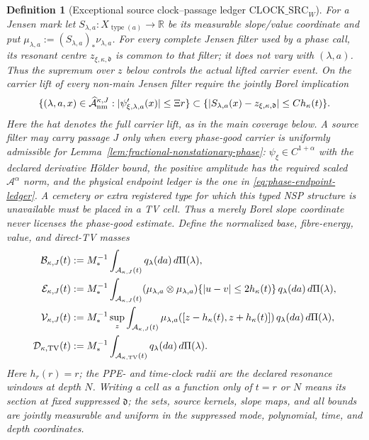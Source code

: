 \documentclass[11pt]{article}
\newtheorem{definition}[theorem]{Definition}
\begin{document}
\begin{definition}[Exceptional source clock--passage ledger
$\mathrm{CLOCK\_SRC}_{W}$]
For a Jensen mark let $S_{\lambda,a}:X_{\operatorname{type}(a)}\to\mathbb R$
be its measurable slope/value coordinate and put
$\mu_{\lambda,a}:=(S_{\lambda,a})_*\nu_{\lambda,a}$.
For every complete Jensen filter used by a phase call, its resonant centre
$z_{\xi,\kappa,\mathfrak d}$ is common to that filter; it does not vary with
$(\lambda,a)$.  Thus the supremum over $z$ below controls the actual lifted
carrier event.  On the carrier lift of every non-main Jensen filter require
the jointly Borel implication
\begin{equation}
\label{eq:nonmain-phase-bad-implication}
 \{(\lambda,a,x)\in\widehat{\mathcal A}_{\rm nm}^{\kappa,J}:
       |\psi'_{\xi,\lambda,a}(x)|\le\Xi r\}
 \subset
 \{|S_{\lambda,a}(x)-z_{\xi,\kappa,\mathfrak d}|
       \le Ch_\kappa(t)\}.
\end{equation}
Here the hat denotes the full carrier lift, as in the main coverage below.
A source filter may carry passage $J$ only when every phase-good carrier is
uniformly admissible for Lemma~\ref{lem:fractional-nonstationary-phase}:
$\psi_\xi\in C^{1+\alpha}$ with the declared derivative H\"older bound, the
positive amplitude has the required scaled $\mathcal A^\alpha$ norm, and
the physical endpoint ledger is the one in
\eqref{eq:phase-endpoint-ledger}.  A cemetery or extra registered type for
which this typed NSP structure is unavailable must be placed in a TV cell.
Thus a merely Borel slope coordinate never licenses the phase-good estimate.
Define the normalized
base, fibre-energy, value, and direct-TV masses
\begin{align}
 \mathcal B_{\kappa,J}(t)&:=M_*^{-1}
  \int_{\mathcal A_{\kappa,J}(t)}q_\lambda(da)\,d\Pi(\lambda),\notag\\
 \mathcal E_{\kappa,J}(t)&:=M_*^{-1}
  \int_{\mathcal A_{\kappa,J}(t)}
  (\mu_{\lambda,a}\otimes\mu_{\lambda,a})
  \{|u-v|\le2h_\kappa(t)\}\,q_\lambda(da)\,d\Pi(\lambda),\notag\\
 \mathcal V_{\kappa,J}(t)&:=M_*^{-1}\sup_z
  \int_{\mathcal A_{\kappa,J}(t)}
  \mu_{\lambda,a}([z-h_\kappa(t),z+h_\kappa(t)])
  \,q_\lambda(da)\,d\Pi(\lambda),\notag\\
 \mathcal D_{\kappa,\mathrm{TV}}(t)&:=M_*^{-1}
  \int_{\mathcal A_{\kappa,\mathrm{TV}}(t)}
       q_\lambda(da)\,d\Pi(\lambda).
 \label{eq:clock-source-partition}
\end{align}
Here $h_r(r)=r$; the PPE- and time-clock radii are the declared resonance
windows at depth $N$.  Writing a cell as a function only of $t=r$ or $N$
means its section at fixed suppressed $\mathfrak d$; the sets, source
kernels, slope maps, and all bounds are jointly measurable and uniform in
the suppressed mode, polynomial, time, and depth coordinates.


\end{definition}
\end{document}
